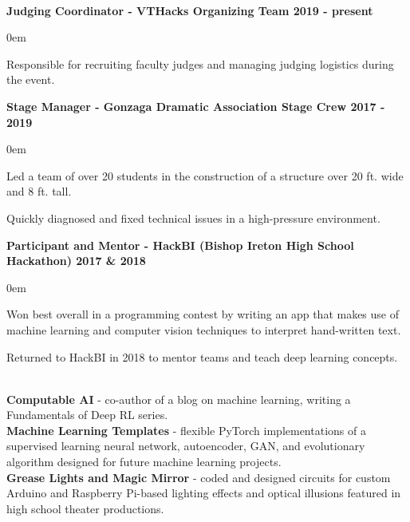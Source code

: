 \documentclass{article}
\begin{document}
\begin{center}
\begin{flushleft}
    {\large\textbf{\underline{}}} \\

    \textbf{Judging Coordinator - VTHacks Organizing Team \hfill 2019 - present}
    \begin{compactitem}
      \itemsep0em
      \item Responsible for recruiting faculty judges and managing judging logistics during the event.
    \end{compactitem}

    \textbf{Stage Manager - Gonzaga Dramatic Association Stage Crew \hfill 2017 - 2019}
    \begin{compactitem}
      \itemsep0em
      \item Led a team of over 20 students in the construction of a structure over 20 ft. wide and 8 ft. tall.
      \item Quickly diagnosed and fixed technical issues in a high-pressure environment.
    \end{compactitem}

    \textbf{Participant and Mentor - HackBI  (Bishop Ireton High School Hackathon) \hfill 2017 \& 2018}
    \begin{compactitem}
      \itemsep0em
      \item Won best overall in a programming contest by writing an app that makes use of machine learning and computer vision techniques to interpret hand-written text.
      \item Returned to HackBI in 2018 to mentor teams and teach deep learning concepts.
    \end{compactitem}


    {\large\textbf{\underline{}}} \\
    \textbf{Computable AI} - co-author of a blog on machine learning, writing a Fundamentals of Deep RL series. \\
    \textbf{Machine Learning Templates} - flexible PyTorch implementations of a supervised learning neural network, autoencoder, GAN, and evolutionary algorithm designed for future machine learning projects. \\
    \textbf{Grease Lights and Magic Mirror} - coded and designed circuits for custom Arduino and Raspberry Pi-based lighting effects and optical illusions featured in high school theater productions.

  \end{flushleft}
\end{center}
\end{document}
